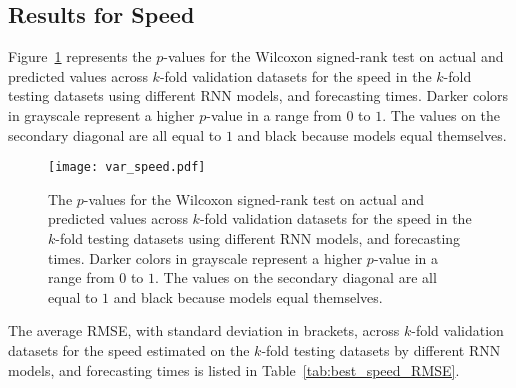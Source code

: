 \subsection{Results for Speed}

Figure~\ref{fig:var_speed} represents the $p$-values for the Wilcoxon signed-rank test on actual and predicted values across $k$-fold validation datasets for the speed in the $k$-fold testing datasets using different RNN models, and forecasting times. Darker colors in grayscale represent a higher $p$-value in a range from $0$ to $1$. The values on the secondary diagonal are all equal to $1$ and black because models equal themselves.

\begin{figure}[!ht]
	\centering
	\texttt{[image: var\_speed.pdf]}
	\caption{The $p$-values for the Wilcoxon signed-rank test on actual and predicted values across $k$-fold validation datasets for the speed in the $k$-fold testing datasets using different RNN models, and forecasting times. Darker colors in grayscale represent a higher $p$-value in a range from $0$ to $1$. The values on the secondary diagonal are all equal to $1$ and black because models equal themselves.}
	\label{fig:var_speed}
\end{figure}

The average RMSE, with standard deviation in brackets, across $k$-fold validation datasets for the speed estimated on the $k$-fold testing datasets by different RNN models, and forecasting times is listed in Table~\ref{tab:best_speed_RMSE}.

\begin{table}[!ht]
	\centering
	\caption{The average RMSE, with standard deviation in brackets, across $k$-fold validation datasets for the speed estimated on the $k$-fold testing datasets by different RNN models, and forecasting times.}
	\label{tab:best_speed_RMSE}
\end{table}

